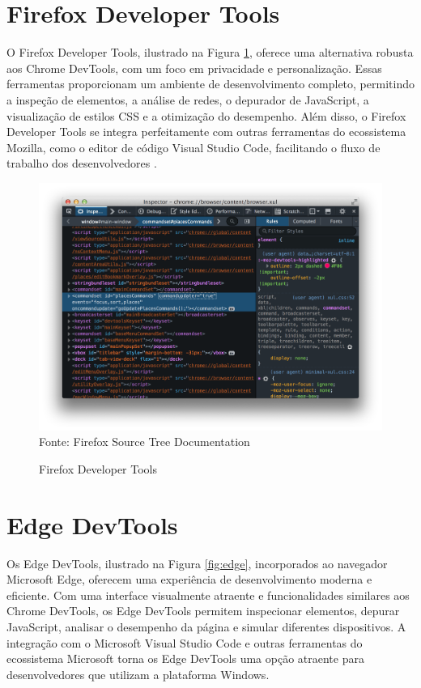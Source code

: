 \section{Firefox Developer Tools}
O Firefox Developer Tools, ilustrado na Figura \ref{fig:firefox}, oferece uma alternativa robusta aos Chrome DevTools, com um foco em privacidade e personalização. Essas ferramentas proporcionam um ambiente de desenvolvimento completo, permitindo a inspeção de elementos, a análise de redes, o depurador de JavaScript, a visualização de estilos CSS e a otimização do desempenho. Além disso, o Firefox Developer Tools se integra perfeitamente com outras ferramentas do ecossistema Mozilla, como o editor de código Visual Studio Code, facilitando o fluxo de trabalho dos desenvolvedores \cite{firefox}.
\begin{figure}[!htb]
    \centering
    \caption{Firefox Developer Tools}
    \includegraphics[width=0.8\linewidth]{assets/firefox.png}\\
    {\footnotesize Fonte: Firefox Source Tree Documentation}
    \label{fig:firefox}
\end{figure}
\section{Edge DevTools}
Os Edge DevTools, ilustrado na Figura \ref{fig:edge}, incorporados ao navegador Microsoft Edge, oferecem uma experiência de desenvolvimento moderna e eficiente. Com uma interface visualmente atraente e funcionalidades similares aos Chrome DevTools, os Edge DevTools permitem inspecionar elementos, depurar JavaScript, analisar o desempenho da página e simular diferentes dispositivos. A integração com o Microsoft Visual Studio Code e outras ferramentas do ecossistema Microsoft torna os Edge DevTools uma opção atraente para desenvolvedores que utilizam a plataforma Windows\cite{edge}.


